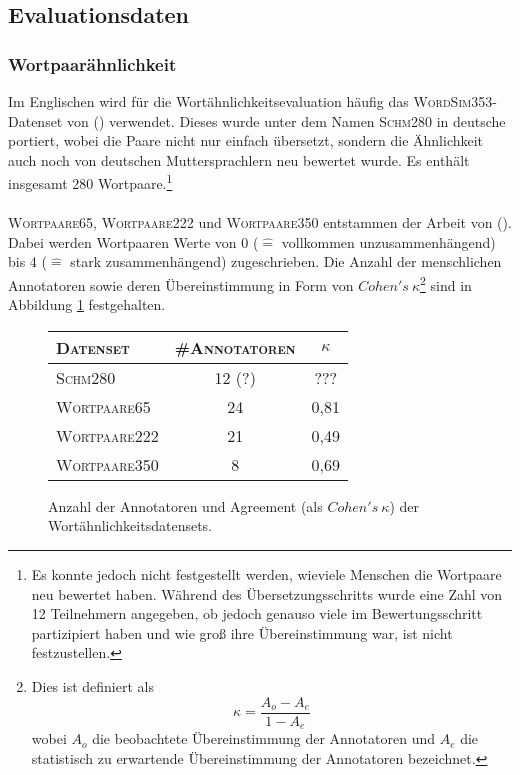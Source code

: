   \subsection{Evaluationsdaten}\label{sec:evaldata}

    \subsubsection{Wortpaarähnlichkeit}

    Im Englischen wird für die Wortähnlichkeitsevaluation häufig das \textsc{WordSim353}-Datenset von (\cite{finkelstein2001placing})
    verwendet. Dieses wurde unter dem Namen \textsc{Schm280} in deutsche portiert, wobei die Paare nicht nur einfach übersetzt, sondern die
    Ähnlichkeit auch noch von deutschen Muttersprachlern neu bewertet wurde. Es enthält insgesamt 280 Wortpaare.\footnote{Es konnte
    jedoch nicht festgestellt werden, wieviele Menschen die Wortpaare neu bewertet haben. Während des Übersetzungsschritts
    wurde eine Zahl von 12 Teilnehmern angegeben, ob jedoch genauso viele im Bewertungsschritt partizipiert haben und wie groß
    ihre Übereinstimmung war, ist nicht festzustellen.}\\ \\
    \textsc{Wortpaare65}, \textsc{Wortpaare222} und \textsc{Wortpaare350} entstammen der Arbeit von (\cite{rubenstein1965contextual}).
    Dabei werden Wortpaaren
    Werte von 0 ($\hat{=}$ vollkommen unzusammenhängend) bis 4 ($\hat{=}$ stark zusammenhängend) zugeschrieben. Die Anzahl
    der menschlichen Annotatoren sowie deren Übereinstimmung in Form von $Cohen's\ \kappa$\footnote{
    Dies ist definiert als
    \[
      \kappa = \frac{A_o - A_e}{1 - A_e}
    \]
    wobei $A_o$ die beobachtete Übereinstimmung der Annotatoren und $A_e$ die statistisch zu erwartende Übereinstimmung
    der Annotatoren bezeichnet.
    } sind in Abbildung \ref{fig:evalsets} festgehalten.

    \begin{figure}[h]
      \centering
      \begin{tabular}{l|cc}
        \textsc{Datenset} & \textsc{\#Annotatoren} & $\kappa$ \\
        \hline
        \textsc{Schm280} & 12 (?) & ??? \\
        \textsc{Wortpaare65} & 24 & 0,81 \\
        \textsc{Wortpaare222} & 21 & 0,49 \\
        \textsc{Wortpaare350} & 8 & 0,69 \\
      \end{tabular}
      \caption[Anzahl der Annotatoren und Agreement der Wortähnlichkeitsdatensets]{Anzahl der Annotatoren und Agreement (als $Cohen's\ \kappa$) der Wortähnlichkeitsdatensets.
      \label{fig:evalsets}}
    \end{figure}

